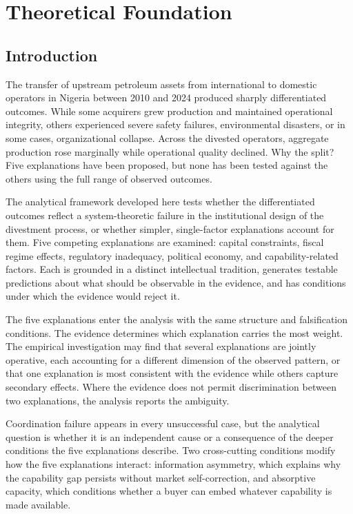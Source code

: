 \hypertarget{theoretical-foundation}{%
\chapter{Theoretical Foundation}\label{theoretical-foundation}}

\hypertarget{introduction}{%
\section{Introduction}\label{introduction}}

The transfer of upstream petroleum assets from international to domestic
operators in Nigeria between 2010 and 2024 produced sharply
differentiated outcomes. While some acquirers grew production and
maintained operational integrity, others experienced severe safety
failures, environmental disasters, or in some cases, organizational
collapse. Across the divested operators, aggregate production rose
marginally while operational quality declined. Why the split? Five
explanations have been proposed, but none has been tested against the
others using the full range of observed outcomes.

The analytical framework developed here tests whether the differentiated
outcomes reflect a system-theoretic failure in the institutional design
of the divestment process, or whether simpler, single-factor
explanations account for them. Five competing explanations are examined:
capital constraints, fiscal regime effects, regulatory inadequacy,
political economy, and capability-related factors. Each is grounded in a
distinct intellectual tradition, generates testable predictions about
what should be observable in the evidence, and has conditions under
which the evidence would reject it.

The five explanations enter the analysis with the same structure and
falsification conditions. The evidence determines which explanation
carries the most weight. The empirical investigation may find that
several explanations are jointly operative, each accounting for a
different dimension of the observed pattern, or that one explanation is
most consistent with the evidence while others capture secondary
effects. Where the evidence does not permit discrimination between two
explanations, the analysis reports the ambiguity.

Coordination failure appears in every unsuccessful case, but the
analytical question is whether it is an independent cause or a
consequence of the deeper conditions the five explanations describe. Two
cross-cutting conditions modify how the five explanations interact:
information asymmetry, which explains why the capability gap persists
without market self-correction, and absorptive capacity, which
conditions whether a buyer can embed whatever capability is made
available.


